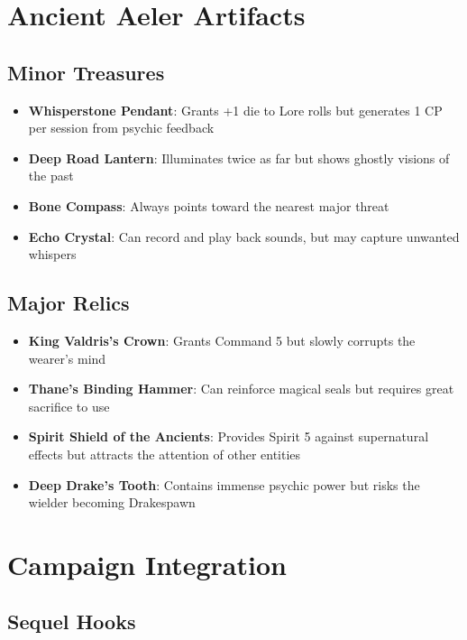\documentclass[11pt]{article}
\begin{document}
\begin{itemize}
{{{{{{{\section{Ancient Aeler Artifacts}

\subsection{Minor Treasures}

\begin{itemize}
\item \textbf{Whisperstone Pendant}: Grants +1 die to Lore rolls but generates 1 CP per session from psychic feedback
\item \textbf{Deep Road Lantern}: Illuminates twice as far but shows ghostly visions of the past
\item \textbf{Bone Compass}: Always points toward the nearest major threat
\item \textbf{Echo Crystal}: Can record and play back sounds, but may capture unwanted whispers
\end{itemize}

\subsection{Major Relics}

\begin{itemize}
\item \textbf{King Valdris's Crown}: Grants Command 5 but slowly corrupts the wearer's mind
\item \textbf{Thane's Binding Hammer}: Can reinforce magical seals but requires great sacrifice to use
\item \textbf{Spirit Shield of the Ancients}: Provides Spirit 5 against supernatural effects but attracts the attention of other entities
\item \textbf{Deep Drake's Tooth}: Contains immense psychic power but risks the wielder becoming Drakespawn
\end{itemize}

\section{Campaign Integration}

\subsection{Sequel Hooks}

}}}}}}}
\end{itemize}
\end{document}
